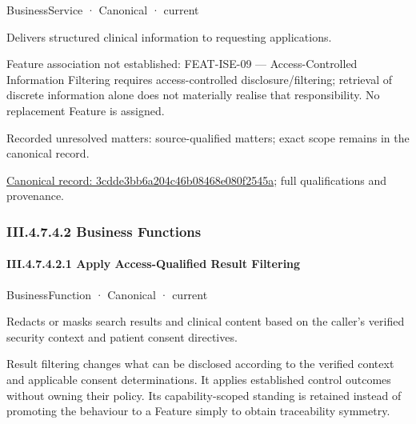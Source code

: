 \label{element:3cdde3bb6a204c46b08468e080f2545a}
{\small BusinessService · Canonical · current}\par

Delivers structured clinical information to requesting applications.



Feature association not established: FEAT-ISE-09 — Access-Controlled Information Filtering requires access-controlled disclosure/filtering; retrieval of discrete information alone does not materially realise that responsibility. No replacement Feature is assigned.


{\small Recorded unresolved matters: source-qualified matters; exact scope remains in the canonical record.}\par
{\footnotesize \href{../../../../continuum/business/business-service/3cdde3bb6a204c46b08468e080f2545a.md}{Canonical record: 3cdde3bb6a204c46b08468e080f2545a}; full qualifications and provenance.}\par
\subsubsection*{III.4.7.4.2 Business Functions}
\label{navigation:III.4.7.4.2}

\paragraph*{III.4.7.4.2.1 Apply Access-Qualified Result Filtering}
\label{navigation:III.4.7.4.2.1}

\label{element:598e46ab52644e70809b3039b7a4c21e}
{\small BusinessFunction · Canonical · current}\par

Redacts or masks search results and clinical content based on the caller's verified security context and patient consent directives.



Result filtering changes what can be disclosed according to the verified context and applicable consent determinations. It applies established control outcomes without owning their policy. Its capability-scoped standing is retained instead of promoting the behaviour to a Feature simply to obtain traceability symmetry.


